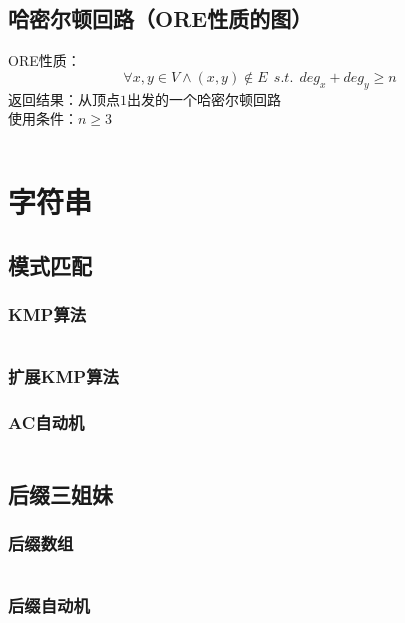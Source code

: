 \documentclass[a4paper]{article}
\newcommand{\cppcode}[1]{
    \inputminted[mathescape]{cpp}{source/#1}
}
\begin{document}
\subsection{哈密尔顿回路（ORE性质的图）}

ORE性质：$$\forall x,y \in V \wedge (x,y) \notin E \ \ s.t. \ \ deg_x+deg_y \geq n$$
\indent 返回结果：从顶点$1$出发的一个哈密尔顿回路\\
\indent 使用条件：$n \geq 3$

\cppcode{graph-theory/hamiltonian-circuit-ore.cpp}

\section{字符串}

\subsection{模式匹配}

\subsubsection{KMP算法}

\cppcode{string-manipulation/knuth-morris-pratt.cpp}

\subsubsection{扩展KMP算法}

\subsubsection{AC自动机}

\cppcode{string-manipulation/aho-corasick-automation.cpp}

\subsection{后缀三姐妹}

\subsubsection{后缀数组}

\cppcode{string-manipulation/suffix-array.cpp}

\subsubsection{后缀自动机}
\end{document}
